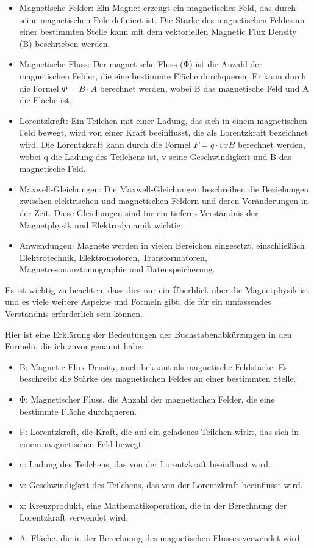 \documentclass[a4paper]{report}
\begin{document}
\begin{itemize}
\item Magnetische Felder: Ein Magnet erzeugt ein magnetisches Feld, das durch seine magnetischen Pole definiert ist. Die Stärke des magnetischen Feldes an einer bestimmten Stelle kann mit dem vektoriellen Magnetic Flux Density (B) beschrieben werden.
\item Magnetische Fluss: Der magnetische Fluss (Φ) ist die Anzahl der magnetischen Felder, die eine bestimmte Fläche durchqueren. Er kann durch die Formel $Φ = B \cdot  A$ berechnet werden, wobei B das magnetische Feld und A die Fläche ist.
\item Lorentzkraft: Ein Teilchen mit einer Ladung, das sich in einem magnetischen Feld bewegt, wird von einer Kraft beeinflusst, die als Lorentzkraft bezeichnet wird. Die Lorentzkraft kann durch die Formel $F = q \cdot  v x B$ berechnet werden, wobei q die Ladung des Teilchens ist, v seine Geschwindigkeit und B das magnetische Feld.
\item Maxwell-Gleichungen: Die Maxwell-Gleichungen beschreiben die Beziehungen zwischen elektrischen und magnetischen Feldern und deren Veränderungen in der Zeit. Diese Gleichungen sind für ein tieferes Verständnis der Magnetphysik und Elektrodynamik wichtig.
\item Anwendungen: Magnete werden in vielen Bereichen eingesetzt, einschließlich Elektrotechnik, Elektromotoren, Transformatoren, Magnetresonanztomographie und Datenspeicherung.
\end{itemize}
Es ist wichtig zu beachten, dass dies nur ein Überblick über die Magnetphysik
ist und es viele weitere Aspekte und Formeln gibt, die für ein umfassendes
Verständnis erforderlich sein können.

Hier ist eine Erklärung der Bedeutungen der Buchstabenabkürzungen in den
Formeln, die ich zuvor genannt habe: 
\begin{itemize} 
\item B: Magnetic Flux Density, auch bekannt als magnetische Feldstärke. Es beschreibt die Stärke des magnetischen Feldes an einer bestimmten Stelle. 
\item Φ: Magnetischer Fluss, die Anzahl der magnetischen Felder, die eine bestimmte Fläche durchqueren. 
\item F: Lorentzkraft, die Kraft, die auf ein geladenes Teilchen wirkt, das sich in einem magnetischen Feld bewegt. 
\item q: Ladung des Teilchens, das von der Lorentzkraft beeinflusst wird. 
\item v: Geschwindigkeit des Teilchens, das von der Lorentzkraft beeinflusst wird.
\item x: Kreuzprodukt, eine Mathematikoperation, die in der Berechnung der Lorentzkraft verwendet wird. 
\item A: Fläche, die in der Berechnung des magnetischen Flusses verwendet wird.
\end{itemize}
\end{document}
